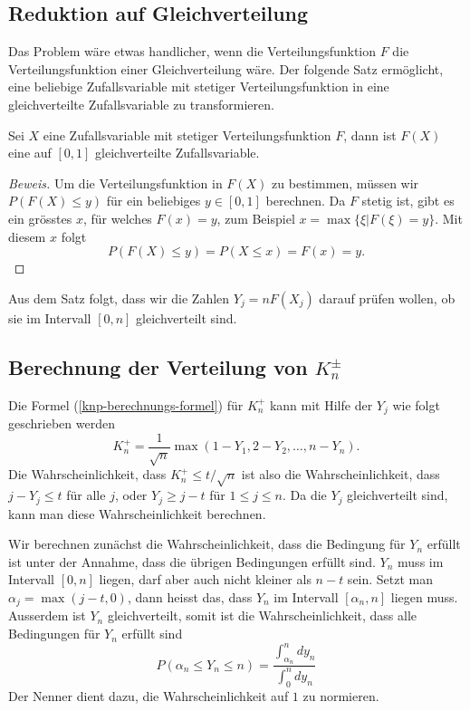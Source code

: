 \subsection{Reduktion auf Gleichverteilung}
Das Problem wäre etwas handlicher, wenn die Verteilungsfunktion $F$
die Verteilungsfunktion einer Gleichverteilung wäre.
Der folgende Satz ermöglicht, eine
beliebige Zufallsvariable mit stetiger Verteilungsfunktion in eine
gleichverteilte Zufallsvariable zu transformieren.
\begin{satz}\label{reduktion-auf-gleichverteilung}
Sei $X$ eine Zufallsvariable mit stetiger Verteilungsfunktion $F$, dann
ist $F(X)$ eine auf $[0,1]$ gleichverteilte Zufallsvariable.
\end{satz}
\begin{proof}[Beweis]
Um die Verteilungsfunktion in $F(X)$ zu bestimmen, müssen wir $P(F(X)\le y)$
für ein beliebiges $y\in[0,1]$ berechnen.
Da $F$ stetig ist, gibt es ein
grösstes $x$, für welches $F(x)= y$, zum Beispiel
$x=\max\{\xi|F(\xi)= y\}$.
Mit diesem $x$ folgt
\[
P(F(X)\le y)=P(X\le x)=F(x)=y.
\]
\end{proof}
Aus dem Satz folgt, dass wir die Zahlen $Y_j=nF(X_j)$ darauf prüfen wollen,
ob sie im Intervall $[0,n]$ gleichverteilt sind.

\subsection{Berechnung der Verteilung von \texorpdfstring{$K_n^{\pm}$}{Kn-plus-minus}}
Die Formel (\ref{knp-berechnungs-formel})
für $K_n^+$ kann mit Hilfe der $Y_j$ wie folgt 
geschrieben werden
\begin{equation}
K_n^+=\frac1{\sqrt{n}}\max(1-Y_1, 2-Y_2,\dots,n-Y_n).
\end{equation}
Die Wahrscheinlichkeit, dass $K_n^+\le t/\sqrt{n}$ ist also die
Wahrscheinlichkeit, dass $j-Y_j\le t$ für alle $j$, oder
$Y_j\ge j-t$ für $1\le j\le n$.
Da die $Y_j$ gleichverteilt sind,
kann man diese Wahrscheinlichkeit berechnen.

Wir berechnen zunächst die Wahrscheinlichkeit, dass die Bedingung
für $Y_n$ erfüllt ist unter der Annahme, dass die übrigen
Bedingungen erfüllt sind.
$Y_n$ muss im Intervall $[0,n]$
liegen, darf aber auch nicht kleiner als $n-t$ sein.
Setzt man $\alpha_j=\max(j-t,0)$, dann heisst das, dass $Y_n$ im
Intervall $[\alpha_n, n]$ liegen muss.
Ausserdem ist $Y_n$ gleichverteilt,
somit ist die Wahrscheinlichkeit, dass alle Bedingungen für $Y_n$ erfüllt
sind
\begin{equation}
P(\alpha_n\le Y_n\le n)=\frac{\int_{\alpha_n}^n dy_n}{\int_0^ndy_n}
\label{kpn-erstes-integral}
\end{equation}
Der Nenner dient dazu, die Wahrscheinlichkeit auf $1$ zu normieren.


